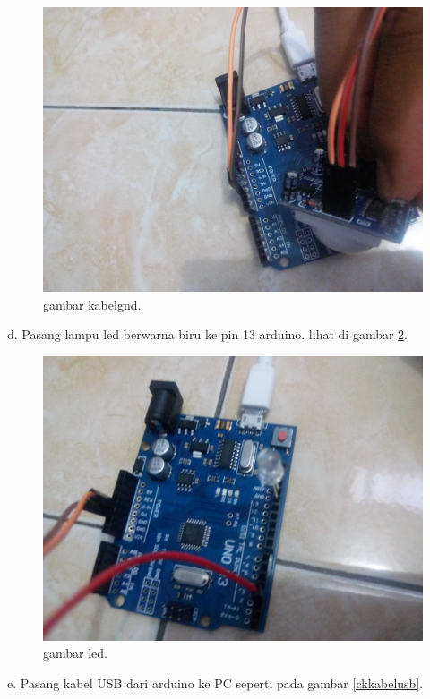 \begin{figure} [ht]
\centerline{\includegraphics[width=1\textwidth]{figures/kabelgnd.JPG}}
\caption{gambar kabelgnd.}
\label{ckkabelgnd}
\end{figure}

d. Pasang lampu led berwarna biru ke pin 13 arduino. lihat di gambar \ref{ckled}.

\begin{figure} [ht]
\centerline{\includegraphics[width=1\textwidth]{figures/led.JPG}}
\caption{gambar led.}
\label{ckled}
\end{figure}

e. Pasang kabel USB dari arduino ke PC seperti pada gambar \ref{ckkabelusb}.

